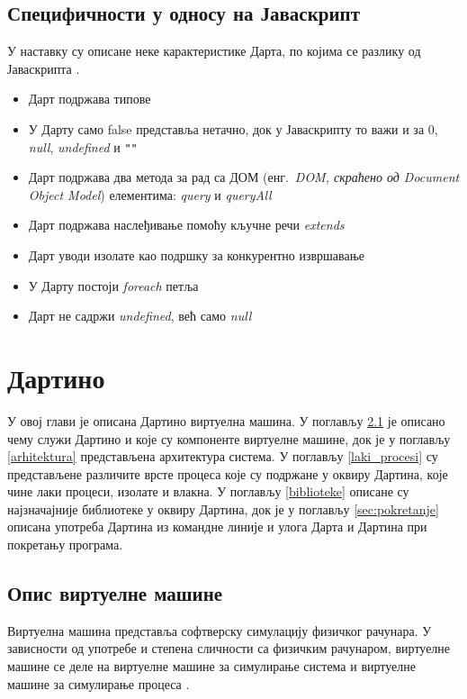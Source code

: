 \documentclass[12pt,oneside]{memoir}
\begin{document}
\section{Специфичности у односу на Јаваскрипт}
\label{specificnosti}
У наставку су описане неке карактеристике Дарта, по којима се разлику од Јаваскрипта \cite{dart, dart1}.
\begin{itemize}
\item Дарт подржава типове
\item У Дарту само false представља нетачно, док у Јаваскрипту то важи и за 0, \textit{null}, \textit{undefined} и \verb|""|
\item Дарт подржава два метода за рад са ДОМ (енг.~\textit{DOM, скраћено од \textit{Document Object Model}}) елементима: \textit{query} и \textit{queryAll}
\item Дарт подржава наслеђивање помоћу кључне речи \textit{extends}
\item Дарт уводи изолате као подршку за конкурентно извршавање
\item У Дарту постоји \textit{foreach} петља
\item Дарт не садржи \textit{undefined}, већ само \textit{null}
\end{itemize}

\chapter{Дартино}
\label{chp:dartino}
У овој глави је описана Дартино виртуелна машина. У поглављу \ref{sec:opis} је описано чему служи Дартино и које су компоненте виртуелне машине, док је у поглављу \ref{arhitektura} представљена архитектура система. У поглављу \ref{laki_procesi} су представљене различите врсте процеса које су подржане у оквиру Дартина, које чине лаки процеси, изолате и влакна. У поглављу \ref{biblioteke} описане су најзначајније библиотеке у оквиру Дартина, док је у поглављу \ref{sec:pokretanje} описана употреба Дартина из командне линије и улога Дарта и Дартина при покретању програма.
\section{Опис виртуелне машине}
\label{sec:opis}

Виртуелна машина представља софтверску симулацију физичког рачунара. У зависности од употребе и степена сличности са физичким рачунаром, виртуелне машине се деле на виртуелне машине за симулирање система и виртуелне машине за симулирање процеса \cite{virtuelna_masina}.
\end{document}
